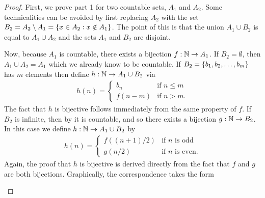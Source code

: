 \documentclass[11pt,twoside=off,numbers=noenddot]{scrbook}
\begin{document}
\begin{proof}
  First, we prove part 1 for two countable sets, $A_1$ and $A_2$.
  Some technicalities can be avoided by first replacing $A_2$ with
  the set $B_2 = A_2 \setminus A_1 = \{ x \in A_2 : x \notin A_1 \}$.
  The point of this is that the union $A_1 \cup B_2$ is equal to $A_1
  \cup A_2$ and the sets $A_1$ and $B_2$ are disjoint.

  Now, because $A_1$ is countable, there exists a bijection $f : \mathbb N
  \to A_1$. If $B_2 = \emptyset$, then $A_1 \cup A_2 = A_1$ which we
  already know to be countable. If $B_2 = \{ b_1, b_2, \dots, b_m \}$
  has $m$ elements then define $h : \mathbb N \to A_1 \cup B_2$ via
  \begin{align*}
    h(n) =
    \begin{cases}
      b_n & \text{if $n \leq m$} \\
      f(n - m) & \text{if $n > m$}.
    \end{cases}
  \end{align*}
  The fact that $h$ is bijective follows immediately from the same
  property of $f$. If $B_2$ is infinite, then by
   it is countable, and so there
  exists a bijection $g : \mathbb N \to B_2$. In this case we define $h :
  \mathbb N \to A_1 \cup B_2$ by
  \begin{align*}
    h(n) =
    \begin{cases}
      f((n + 1) / 2) & \text{if $n$ is odd} \\
      g(n / 2) & \text{if $n$ is even}.
    \end{cases}
  \end{align*}
  Again, the proof that $h$ is bijective is derived directly from the
  fact that $f$ and $g$ are both bijections. Graphically, the
  correspondence takes the form

  \begin{tightfigure}
    \centering
  \end{tightfigure}


\end{proof}
\end{document}
